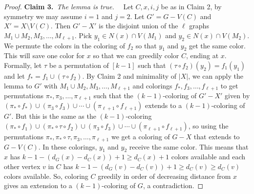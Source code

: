 \documentclass[12pt]{article}
\theoremstyle{plain}
\theoremstyle{definition}
\theoremstyle{remark}
\newcommand{\irange}[1]{\left[#1\right]}
\newcommand{\claim}[2]{{\bf Claim #1.}~{\it #2}~~}
\begin{document}
\begin{proof}
\claim{3}{The lemma is true.}
Let $C, x,i,j$ be as in Claim 2, by symmetry we may assume $i=1$ and $j=2$. Let $G' = G - V(C)$ and $X' = X \setminus V(C)$.  Then $G' - X'$ is the disjoint union of the $\ell$ graphs $M_1 \cup M_2, M_3, \ldots, M_{\ell + 1}$.  Pick $y_1 \in N(x) \cap V(M_1)$ and $y_2 \in N(x) \cap V(M_2)$. We permute the colors in the coloring of $f_2$ so that $y_1$ and $y_2$ get the same color.  This will save one color for $x$ so that we can greedily color $C$, ending at $x$. Formally, let $\tau$ be a permutation of $\irange{k-1}$ such that $(\tau \circ f_2)(y_2) = f_1(y_1)$ and let $f_* = f_1 \cup (\tau \circ f_2)$.   
By Claim 2 and minimality of $|X|$, we can apply the lemma to $G'$ with $M_1 \cup M_2, M_3, \ldots, M_{\ell + 1}$ and colorings $f_*, f_3, \ldots, f_{\ell +1}$ to get permutations $\pi_*, \pi_3, \ldots, \pi_{\ell+1}$ such that the $(k-1)$-coloring of $G'-X'$ given by $(\pi_* \circ f_*) \cup (\pi_3 \circ f_3) \cup \cdots \cup (\pi_{\ell + 1} \circ f_{\ell + 1})$ extends to a $(k - 1)$-coloring of $G'$.  But this is the same as the $(k-1)$-coloring $(\pi_* \circ f_1) \cup (\pi_* \circ \tau \circ f_2) \cup (\pi_3 \circ f_3) \cup \cdots \cup (\pi_{\ell + 1} \circ f_{\ell + 1})$, so using the permutations $\pi_*, \pi_* \circ \tau, \pi_3, \ldots, \pi_{\ell + 1}$ we get a coloring of $G - X$ that extends to $G - V(C)$.  
In these colorings, $y_1$ and $y_2$ receive the same color. This means that $x$ has $k - 1 - (d_G(x) - d_C(x)) + 1 \ge d_C(x) + 1$ colors available and each other vertex $v$ in $C$ has $k - 1 - (d_G(v) - d_C(v)) + 1 \ge d_C(v) \ge d_C(v)$ colors available.  So, coloring $C$ greedily in order of decreasing distance from $x$ gives an extension to a $(k - 1)$-coloring of $G$, a contradiction.
\end{proof}
\end{document}
